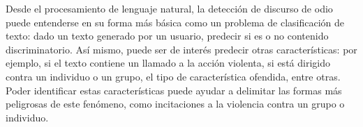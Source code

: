 Desde el procesamiento de lenguaje natural, la detección de discurso de odio puede entenderse en su forma más básica como un problema de clasificación de texto: dado un texto generado por un usuario, predecir si es o no contenido discriminatorio. Así mismo, puede ser de interés predecir otras características: por ejemplo, si el texto contiene un llamado a la acción violenta, si está dirigido contra un individuo o un grupo, el tipo de característica ofendida, entre otras. Poder identificar estas características puede ayudar a delimitar las formas más peligrosas de este fenómeno, como incitaciones a la violencia contra un grupo o individuo.



